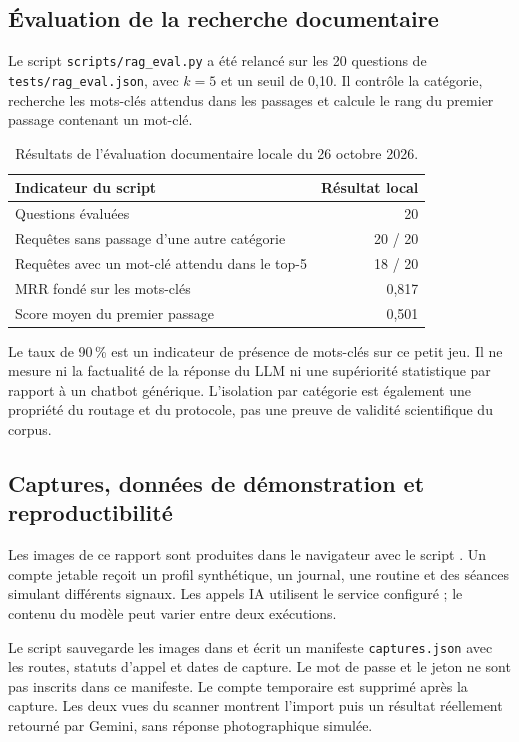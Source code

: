 \documentclass[11pt,a4paper]{article}
\begin{document}
\subsection{Évaluation de la recherche documentaire}
Le script \texttt{scripts/rag\_eval.py} a été relancé sur les 20 questions de \texttt{tests/rag\_eval.json}, avec \(k=5\) et un seuil de 0,10. Il contrôle la catégorie, recherche les mots-clés attendus dans les passages et calcule le rang du premier passage contenant un mot-clé.
\begin{table}[H]
\begin{tabularx}{\linewidth}{Xr}
\toprule
\textbf{Indicateur du script} & \textbf{Résultat local} \\
\midrule
Questions évaluées & 20 \\
Requêtes sans passage d'une autre catégorie & 20 / 20 \\
Requêtes avec un mot-clé attendu dans le top-5 & 18 / 20 \\
MRR fondé sur les mots-clés & 0,817 \\
Score moyen du premier passage & 0,501 \\
\bottomrule
\end{tabularx}
\caption{Résultats de l'évaluation documentaire locale du 26 octobre 2026.}
\end{table}
Le taux de 90\,\% est un indicateur de présence de mots-clés sur ce petit jeu. Il ne mesure ni la factualité de la réponse du LLM ni une supériorité statistique par rapport à un chatbot générique. L'isolation par catégorie est également une propriété du routage et du protocole, pas une preuve de validité scientifique du corpus.

\clearpage
\subsection{Captures, données de démonstration et reproductibilité}
Les images de ce rapport sont produites dans le navigateur avec le script . Un compte jetable reçoit un profil synthétique, un journal, une routine et des séances simulant différents signaux. Les appels IA utilisent le service configuré ; le contenu du modèle peut varier entre deux exécutions.

Le script sauvegarde les images dans  et écrit un manifeste \texttt{captures.json} avec les routes, statuts d'appel et dates de capture. Le mot de passe et le jeton ne sont pas inscrits dans ce manifeste. Le compte temporaire est supprimé après la capture. Les deux vues du scanner montrent l'import puis un résultat réellement retourné par Gemini, sans réponse photographique simulée.
\end{document}
